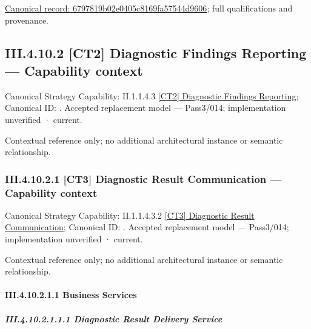 {\footnotesize \href{../../../../../../../continuum/business/business-function/6797819b02e0405c8169fa57544d9606.md}{Canonical record: 6797819b02e0405c8169fa57544d9606}; full qualifications and provenance.}\par
\subsection*{III.4.10.2 [CT2] Diagnostic Findings Reporting — Capability context}
\label{navigation:III.4.10.2}

{\small Canonical Strategy Capability: II.1.1.4.3 \hyperref[element:dc9a2828b2524ddf8bbfb6adf32926f4]{[CT2] Diagnostic Findings Reporting}; Canonical ID: \texttt{}. Accepted replacement model — Pass3/014; implementation unverified · current.}\par
Contextual reference only; no additional architectural instance or semantic relationship.\par
\subsubsection*{III.4.10.2.1 [CT3] Diagnostic Result Communication — Capability context}
\label{navigation:III.4.10.2.1}

{\small Canonical Strategy Capability: II.1.1.4.3.2 \hyperref[element:1eb70d951f164ed8a0b75ce1704b9083]{[CT3] Diagnostic Result Communication}; Canonical ID: \texttt{}. Accepted replacement model — Pass3/014; implementation unverified · current.}\par
Contextual reference only; no additional architectural instance or semantic relationship.\par
\paragraph*{III.4.10.2.1.1 Business Services}
\label{navigation:III.4.10.2.1.1}

\subparagraph*{III.4.10.2.1.1.1 Diagnostic Result Delivery Service}
\label{navigation:III.4.10.2.1.1.1}


